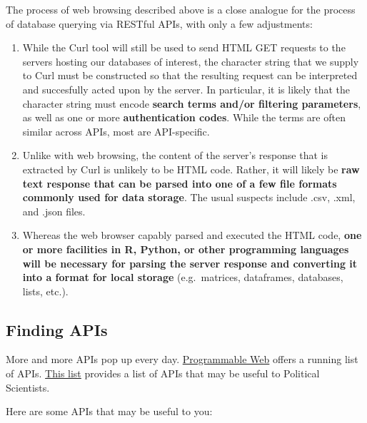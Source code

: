 \documentclass[]{book}
\begin{document}
The process of web browsing described above is a close analogue for the
process of database querying via RESTful APIs, with only a few
adjustments:

\begin{enumerate}
\def\labelenumi{\arabic{enumi}.}
\item
  While the Curl tool will still be used to send HTML GET requests to
  the servers hosting our databases of interest, the character string
  that we supply to Curl must be constructed so that the resulting
  request can be interpreted and succesfully acted upon by the server.
  In particular, it is likely that the character string must encode
  \textbf{search terms and/or filtering parameters}, as well as one or
  more \textbf{authentication codes}. While the terms are often similar
  across APIs, most are API-specific.
\item
  Unlike with web browsing, the content of the server's response that is
  extracted by Curl is unlikely to be HTML code. Rather, it will likely
  be \textbf{raw text response that can be parsed into one of a few file
  formats commonly used for data storage}. The usual suspects include
  .csv, .xml, and .json files.
\item
  Whereas the web browser capably parsed and executed the HTML code,
  \textbf{one or more facilities in R, Python, or other programming
  languages will be necessary for parsing the server response and
  converting it into a format for local storage} (e.g.~matrices,
  dataframes, databases, lists, etc.).
\end{enumerate}

\subsection{Finding APIs}\label{finding-apis}

More and more APIs pop up every day.
\href{https://www.programmableweb.com/apis/directory}{Programmable Web}
offers a running list of APIs.
\href{https://ucsd.libguides.com/c.php?g=90743\&p=3202435}{This list}
provides a list of APIs that may be useful to Political Scientists.

Here are some APIs that may be useful to you:
\end{document}
